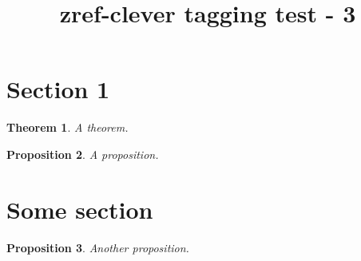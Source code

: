 \documentclass{article}
\title{zref-clever tagging test - 3}
\newtheorem{mytheorem}{Theorem}[section]
\newtheorem{myproposition}[mytheorem]{Proposition}
\begin{document}
\section{Section 1}
\begin{mytheorem}
A theorem.
\end{mytheorem}
\begin{myproposition}
A proposition.
\end{myproposition}
\section{Some section}
\begin{myproposition}
Another proposition.
\end{myproposition}

\end{document}

